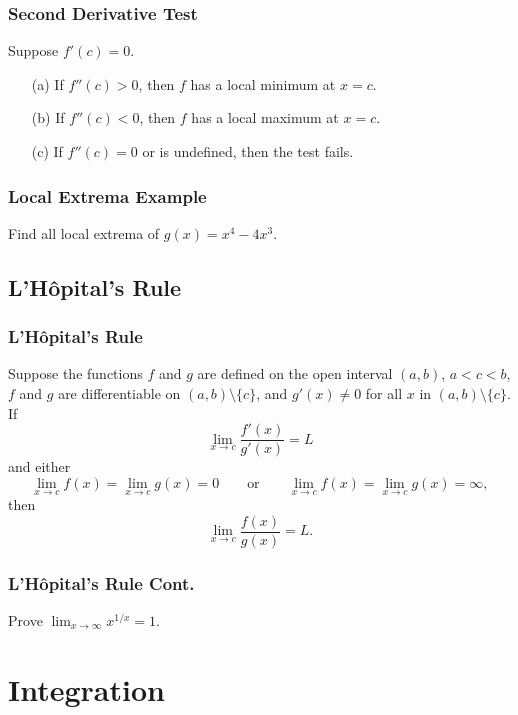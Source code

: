 \documentclass{beamer}
\begin{document}
\begin{frame}
\frametitle{Second Derivative Test}
Suppose $f'(c) = 0$.
\begin{enumerate}
\item[(a)] If $f''(c) > 0$, then $f$ has a local minimum at $x = c$.
\item[(b)] If $f''(c) < 0$, then $f$ has a local maximum at $x = c$.
\item[(c)] If $f''(c) = 0$ or is undefined, then the test fails.
\end{enumerate}
\end{frame}

\begin{frame}[t]
\frametitle{Local Extrema Example}
\begin{Example}
Find all local extrema of $g(x) = x^4 - 4x^3$.
\end{Example}
\end{frame}


\subsection{L'H\^{o}pital's Rule}

\begin{frame}
\frametitle{L'H\^{o}pital's Rule}

\begin{Theorem}
Suppose the functions $f$ and $g$ are defined on the open interval $(a, b)$, $a < c < b$, $f$ and $g$ are differentiable on $(a, b)\setminus\{c\}$, and $g' (x) \neq 0$ for all $x$ in $(a, b)\setminus\{c\}$. If
$$
\lim_{x\to c} \frac{f'(x)}{g'(x)} = L
$$
and either
$$
\lim_{x\to c} f(x) = \lim_{x\to c} g(x) = 0\qquad\text{or}\qquad \lim_{x\to c} f(x) = \lim_{x\to c} g(x) = \infty,
$$
then
$$
\lim_{x\to c} \frac{f(x)}{g(x)} = L.
$$
\end{Theorem}
\end{frame}

\begin{frame}[t]
\frametitle{L'H\^{o}pital's Rule Cont.}
\begin{Example}
Prove $\displaystyle\lim_{x\to\infty} x^{1/x} = 1$.
\end{Example}
\end{frame}



\section{Integration}
\end{document}
